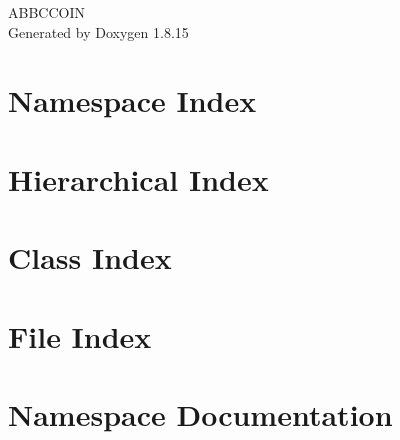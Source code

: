 \let\mypdfximage\pdfximage\def\pdfximage{\immediate\mypdfximage}\documentclass[twoside]{book}
\newcommand{\+}{\discretionary{\mbox{\scriptsize$\hookleftarrow$}}{}{}}
\newcommand{\clearemptydoublepage}{%
  \newpage{\pagestyle{empty}\cleardoublepage}%
}
\begin{document}
\hypersetup{pageanchor=false,
             bookmarksnumbered=true,
             pdfencoding=unicode
            }
\begin{titlepage}
\vspace*{7cm}
\begin{center}%
{\Large A\+B\+B\+C\+C\+O\+IN }\\
\vspace*{1cm}
{\large Generated by Doxygen 1.8.15}\\
\end{center}
\end{titlepage}
\clearemptydoublepage
{}
\tableofcontents
\clearemptydoublepage
{}
\hypersetup{pageanchor=true}

\chapter{Namespace Index}

\chapter{Hierarchical Index}

\chapter{Class Index}

\chapter{File Index}

\chapter{Namespace Documentation}

\end{document}
